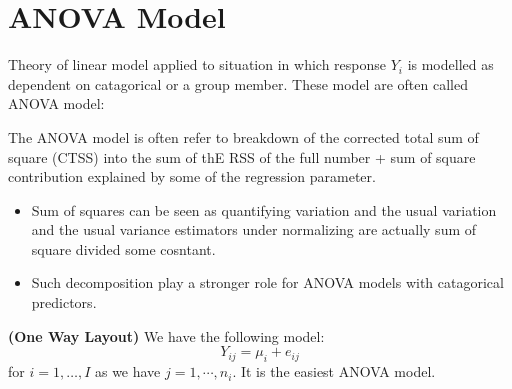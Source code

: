 \section{ANOVA Model}

\begin{remark}
    Theory of linear model applied to situation in which response $Y_i$ is modelled as dependent on catagorical or a group member. These model are often called ANOVA model:
\end{remark}

\begin{remark}
    The ANOVA model is often refer to breakdown of the corrected total sum of square (CTSS) into the sum of thE RSS of the full number + sum of square contribution explained by some of the regression parameter. 
    \begin{itemize}
        \item Sum of squares can be seen as quantifying variation and the usual variation and the usual variance estimators under normalizing are actually sum of square divided some cosntant. 
        \item Such decomposition play a stronger role for ANOVA models with catagorical predictors.
    \end{itemize} 
\end{remark}

\begin{definition}{\textbf{(One Way Layout)}}
    We have the following model:
    \begin{equation*}
        Y_{ij} = \mu_i + e_{ij}
    \end{equation*}
    for $i=1,\dots,I$ as we have $j=1,\cdots,n_i$. It is the easiest ANOVA model. 
\end{definition}


